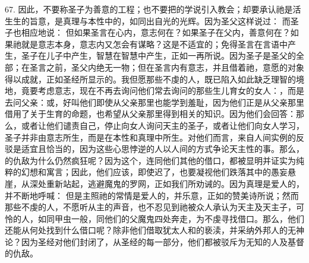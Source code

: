 67. 因此，不要称圣子为善意的工程；也不要把的学说引入教会；却要承认祂是活生生的旨意，是真理与本性中的，如同出自光的光辉。因为圣父这样说过： 而圣子也相应地说： 但如果圣言在心内，意志何在？如果圣子在父内，善意何在？如果祂就是意志本身，意志内又怎会有谋略？这是不适宜的；免得圣言在言语中产生，圣子在儿子中产生，智慧在智慧中产生，正如一再所说。因为圣子是圣父的全部；在圣言之前，圣父内绝无一物；但在圣言内有意志，并且借着祂，意愿的对象得以成就，正如圣经所显示的。我但愿那些不虔的人，既已陷入如此缺乏理智的境地，竟要考虑意志，现在不再去询问他们常去询问的那些生儿育女的女人：，而是去问父亲：或，好叫他们即使从父亲那里也能学到羞耻，因为他们正是从父亲那里借用了关于生育的命题，也希望从父亲那里得到相关的知识。因为他们会回答：那么，或者让他们谴责自己，停止向女人询问天主的圣子，或者让他们向女人学习，圣子并非由意志所生，而是在本性和真理中所生。对他们而言，来自人间实例的反驳是适宜且恰当的，因为这些心思悖逆的人以人间的方式争论天主性的事。那么，的仇敌为什么仍然疯狂呢？因为这个，连同他们其他的借口，都被显明并证实为纯粹的幻想和寓言；因此，他们应该，即使迟了，也要凝视他们跌落其中的愚妄悬崖，从深处重新站起，逃避魔鬼的罗网，正如我们所劝诫的。因为真理是爱人的，并不断地呼喊： 但是主照祂的常情是爱人的，并乐意，正如的赞美诗所说；然而那些不虔的人，不愿听从主的声音，也不忍见到祂被众人承认为天主及天主子，可怜的人，如同甲虫一般，同他们的父魔鬼四处奔走，为不虔寻找借口。那么，他们还能从何处找到什么借口呢？除非他们借取犹太人和的亵渎，并采纳外邦人的无神论？因为圣经对他们封闭了，从圣经的每一部分，他们都被驳斥为无知的人及基督的仇敌。\par


